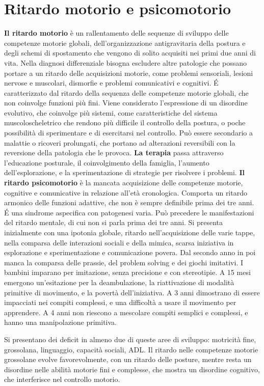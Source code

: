 \chapter{Ritardo motorio e psicomotorio}
\textbf{Il ritardo motorio} è un rallentamento delle sequenze di sviluppo delle competenze motorie globali, dell'organizzazione
antigravitaria della postura e degli schemi di spostamento che vengono di solito acquisiti nei primi due anni di vita.
Nella diagnosi differenziale bisogna escludere altre patologie che possano portare a un ritardo delle acquisizioni motorie, come
problemi sensoriali, lesioni nervose e muscolari, dismorfie e problemi comunicativi e cognitivi. \'E caratterizzato dal ritardo della
sequenza delle competenze motorie globali, che non coinvolge funzioni più fini.
Viene considerato l'espressione di un disordine evolutivo, che coinvolge più sistemi, come caratteristiche del sistema
muscoloscheletrico che rendono più difficile il controllo della postura, o poche possibilità di sperimentare e di esercitarsi nel
controllo. Può essere secondario a malattie o ricoveri prolungati, che portano ad alterazioni reversibili con la reversione della
patologia che le provoca.
\textbf{La terapia} passa attraverso l'educazione posturale, il coinvolgimento della famiglia, l'aumento dell'esplorazione, e la
sperimentazione di strategie per risolvere i problemi.
\textbf{Il ritardo psicomotorio} è la mancata acquisizione delle competenze motorie, cognitive e comunicative in relazione all'età
cronologica. Comporta un ritardo armonico delle funzioni adattive, che non è sempre definibile prima dei tre anni.
\'E una sindrome aspecifica con patogenesi varia. Può precedere le manifestazioni del ritardo mentale, di cui non si parla prima dei tre
anni.
Si presenta inizialmente con una ipotonia globale, ritardo nell'acquisizione delle varie tappe, nella comparsa delle interazioni sociali
e della mimica, scarsa iniziativa in esplorazione e sperimentazione e comunicazione povera. Dal secondo anno in poi manca la comparsa
delle prassie, del problem solving e dei giochi imitativi. I bambini imparano per imitazione, senza precisione e con stereotipie.
A 15 mesi emergono un'esitazione per la deambulazione, la riattivazione di modalità primitive di movimento, e la povertà
dell'iniziativa.
A 3 anni dimostrano di essere impacciati nei compiti complessi, e una difficoltà a usare il movimento per apprendere.
A 4 anni non riescono a mescolare compiti semplici e complessi, e hanno una manipolazione primitiva.

Si presentano dei deficit in almeno due di queste aree di sviluppo: motricità fine, grossolana, linguaggio, capacità sociali, ADL. Il
ritardo nelle competenze motorie grossolane evolve favorevolmente, con un ritardo delle posture, mentre resta un disordine nelle abilità
motorie fini e complesse, che mostra un disordine cognitivo, che interferisce nel controllo motorio.

